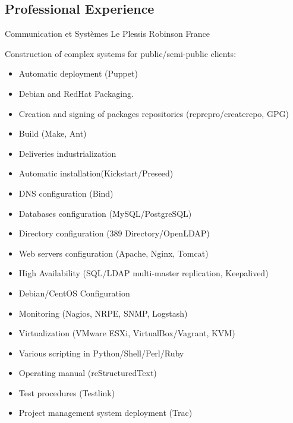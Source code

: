 \documentclass[10pt,a4paper,sans]{moderncv}        %
\begin{document}
\subsection{Professional Experience}
              {Communication et Systèmes}
              {Le Plessis Robinson}
              {France}
              {Construction of complex systems for public/semi-public clients:
                \begin{itemize}
                \item Automatic deployment (Puppet)
                \item Debian and RedHat Packaging.
                \item Creation and signing of packages repositories (reprepro/createrepo, GPG)
                \item Build (Make, Ant)
                \item Deliveries industrialization
                \item Automatic installation(Kickstart/Preseed)
                \item DNS configuration (Bind)
                \item Databases configuration (MySQL/PostgreSQL)
                \item Directory configuration (389 Directory/OpenLDAP)
                \item Web servers configuration (Apache, Nginx, Tomcat)
                \item High Availability (SQL/LDAP multi-master replication, Keepalived)
                \item Debian/CentOS Configuration
                \item Monitoring (Nagios, NRPE, SNMP, Logstash)
                \item Virtualization (VMware ESXi, VirtualBox/Vagrant, KVM)
                \item Various scripting in Python/Shell/Perl/Ruby
                \item Operating manual (reStructuredText)
                \item Test procedures (Testlink)
                \item Project management system deployment (Trac)
                \end{itemize}
              }
\end{document}
